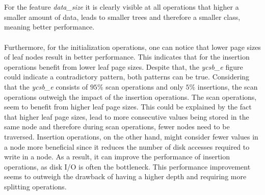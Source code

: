 \\\\
For the feature \textit{data\_size} it is clearly visible at all operations that higher a smaller amount of data, leads to smaller trees and therefore a smaller class, meaning better performance. 
\\\\
Furthermore, for the initialization operations, one can notice that lower page sizes of leaf nodes result in better performance. This indicates that for the insertion operations benefit from lower leaf page sizes. Despite that, the \textit{ycsb\_e} figure could indicate a contradictory pattern, both patterns can be true. Considering that the \textit{ycsb\_e} consists of $95\%$ scan operations and only $5\%$ insertions, the scan operations outweigh the impact of the insertion operations. The scan operations, seem to benefit from higher leaf page sizes. This could be explained by the fact that higher leaf page sizes, lead to more consecutive values being stored in the same node and therefore during scan operations, fewer nodes need to be traversed. Insertion operations, on the other hand, might consider fewer values in a node more beneficial since it reduces the number of disk accesses required to write in a node. As a result, it can improve the performance of insertion operations, as disk I/O is often the bottleneck. This performance improvement seems to outweigh the drawback of having a higher depth and requiring more splitting operations. 

